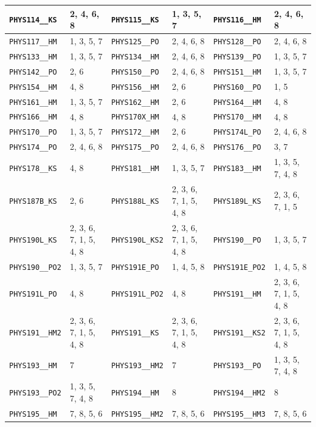 \begin{longtable}{|l|l||l|l||l|l|}
    \verb|PHYS114__KS| & 2, 4, 6, 8 & \verb|PHYS115__KS| & 1, 3, 5, 7 & \verb|PHYS116__HM| & 2, 4, 6, 8\\\hline
    \verb|PHYS117__HM| & 1, 3, 5, 7 & \verb|PHYS125__PO| & 2, 4, 6, 8 & \verb|PHYS128__PO| & 2, 4, 6, 8\\\hline
    \verb|PHYS133__HM| & 1, 3, 5, 7 & \verb|PHYS134__HM| & 2, 4, 6, 8 & \verb|PHYS139__PO| & 1, 3, 5, 7\\\hline
    \verb|PHYS142__PO| & 2, 6 & \verb|PHYS150__PO| & 2, 4, 6, 8 & \verb|PHYS151__HM| & 1, 3, 5, 7\\\hline
    \verb|PHYS154__HM| & 4, 8 & \verb|PHYS156__HM| & 2, 6 & \verb|PHYS160__PO| & 1, 5\\\hline
    \verb|PHYS161__HM| & 1, 3, 5, 7 & \verb|PHYS162__HM| & 2, 6 & \verb|PHYS164__HM| & 4, 8\\\hline
    \verb|PHYS166__HM| & 4, 8 & \verb|PHYS170X_HM| & 4, 8 & \verb|PHYS170__HM| & 4, 8\\\hline
    \verb|PHYS170__PO| & 1, 3, 5, 7 & \verb|PHYS172__HM| & 2, 6 & \verb|PHYS174L_PO| & 2, 4, 6, 8\\\hline
    \verb|PHYS174__PO| & 2, 4, 6, 8 & \verb|PHYS175__PO| & 2, 4, 6, 8 & \verb|PHYS176__PO| & 3, 7\\\hline
    \verb|PHYS178__KS| & 4, 8 & \verb|PHYS181__HM| & 1, 3, 5, 7 & \verb|PHYS183__HM| & 1, 3, 5, 7, 4, 8\\\hline
    \verb|PHYS187B_KS| & 2, 6 & \verb|PHYS188L_KS| & 2, 3, 6, 7, 1, 5, 4, 8 & \verb|PHYS189L_KS| & 2, 3, 6, 7, 1, 5\\\hline
    \verb|PHYS190L_KS| & 2, 3, 6, 7, 1, 5, 4, 8 & \verb|PHYS190L_KS2| & 2, 3, 6, 7, 1, 5, 4, 8 & \verb|PHYS190__PO| & 1, 3, 5, 7\\\hline
    \verb|PHYS190__PO2| & 1, 3, 5, 7 & \verb|PHYS191E_PO| & 1, 4, 5, 8 & \verb|PHYS191E_PO2| & 1, 4, 5, 8\\\hline
    \verb|PHYS191L_PO| & 4, 8 & \verb|PHYS191L_PO2| & 4, 8 & \verb|PHYS191__HM| & 2, 3, 6, 7, 1, 5, 4, 8\\\hline
    \verb|PHYS191__HM2| & 2, 3, 6, 7, 1, 5, 4, 8 & \verb|PHYS191__KS| & 2, 3, 6, 7, 1, 5, 4, 8 & \verb|PHYS191__KS2| & 2, 3, 6, 7, 1, 5, 4, 8\\\hline
    \verb|PHYS193__HM| & 7 & \verb|PHYS193__HM2| & 7 & \verb|PHYS193__PO| & 1, 3, 5, 7, 4, 8\\\hline
    \verb|PHYS193__PO2| & 1, 3, 5, 7, 4, 8 & \verb|PHYS194__HM| & 8 & \verb|PHYS194__HM2| & 8\\\hline
    \verb|PHYS195__HM| & 7, 8, 5, 6 & \verb|PHYS195__HM2| & 7, 8, 5, 6 & \verb|PHYS195__HM3| & 7, 8, 5, 6\\\hline

\end{longtable}
